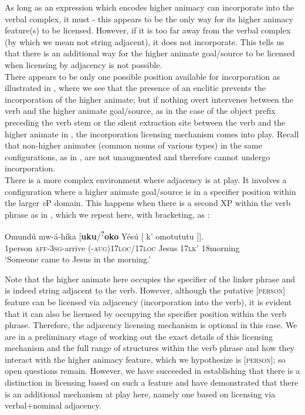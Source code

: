 \documentclass[output=paper]{langscibook}
\begin{document}
As long as an expression which encodes higher animacy can incorporate into the verbal complex, it must - this appears to be the only way for its higher animacy feature(s) to be licensed. However, if it is too far away from the verbal complex (by which we mean not string adjacent), it does not incorporate. This tells us that there is an additional way for the higher animate goal/source to be licensed when licensing by adjacency is not possible. \\
\indent There appears to be only one possible position available for incorporation as illustrated in , where we see that the presence of an enclitic prevents the incorporation of the higher animate; but if nothing overt intervenes between the verb and the higher animate goal/source, as in the case of the object prefix preceding the verb stem  or the silent extraction site between the verb and the higher animate in , the incorporation licensing mechanism comes into play. Recall that non-higher animates (common nouns of various types) in the same configurations, as in , are not unaugmented and therefore cannot undergo incorporation. \\
\indent There is a more complex environment where adjacency is at play. It involves a configuration where a higher animate goal/source is in a specifier position within the larger \textit{v}P domain. This happens when there is a second XP within the verb phrase as in , which we repeat here, with bracketing, as :

\ea
 \label{ex:schneider:adverbRepeated}
\gll Omundú mw-á-híka    [\textbf{uku}/\textbf{\textsuperscript{?}oko} Y\'esú [ k' omotututu ]]. \\
1person  \textsc{aff-3sg-}arrive (-\textsc{aug})17\textsc{loc}/17\textsc{loc} Jesus {} 17\textsc{lk'} 18morning {} \\
\glt `Someone came to Jesus in the morning.' 
\z

Note that the higher animate here occupies the specifier of the linker phrase and is indeed string adjacent to the verb. However, although the putative \textsc{[person]} feature can be licensed via adjacency (incorporation into the verb), it is evident that it can also be licensed by occupying the specifier position within the verb phrase. Therefore, the adjacency licensing mechanism is optional in this case. We are in a preliminary stage of working out the exact details of this licensing mechanism and the full range of structures within the verb phrase and how they interact with the higher animacy feature, which we hypothesize is \textsc{[person]}; so open questions remain. However, we have succeeded in establishing that there is a distinction in licensing based on such a feature and have demonstrated that there is an additional mechanism at play here, namely one based on licensing via verbal+nominal adjacency. 
\end{document}
